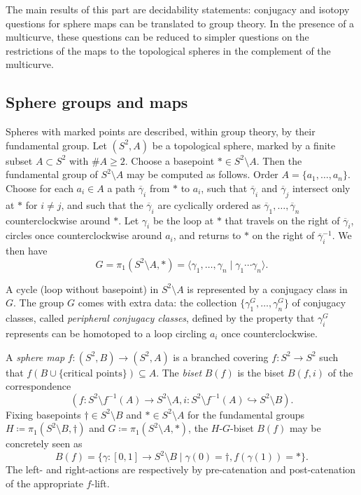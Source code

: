 \documentclass{amsart}
\begin{document}
The main results of this part are decidability statements: conjugacy
and isotopy questions for sphere maps can be translated to group
theory. In the presence of a multicurve, these questions can be
reduced to simpler questions on the restrictions of the maps to the
topological spheres in the complement of the multicurve.

\subsection{Sphere groups and maps}\label{ss:spheregroups}
Spheres with marked points are described, within group theory, by
their fundamental group. Let $(S^2,A)$ be a topological sphere, marked
by a finite subset $A\subset S^2$ with $\#A\ge 2$. Choose a basepoint
$*\in S^2\setminus A$. Then the fundamental group of $S^2\setminus A$
may be computed as follows. Order $A=\{a_1,\dots,a_n\}$. Choose for
each $a_i\in A$ a path $\overline\gamma_i$ from $*$ to $a_i$, such
that $\overline\gamma_i$ and $\overline\gamma_j$ intersect only at $*$
for $i\neq j$, and such that the $\overline\gamma_i$ are cyclically
ordered as $\overline\gamma_1,\dots,\overline\gamma_n$
counterclockwise around $*$. Let $\gamma_i$ be the loop at $*$ that
travels on the right of $\overline\gamma_i$, circles once
counterclockwise around $a_i$, and returns to $*$ on the right of
$\overline\gamma_i^{-1}$. We then have
\begin{equation}\label{eq:spheregroup}
  G=\pi_1(S^2\setminus A,*)=\langle \gamma_1,\dots,\gamma_n\mid \gamma_1\cdots\gamma_n\rangle.
\end{equation}

A cycle (loop without basepoint) in $S^2\setminus A$ is represented by
a conjugacy class in $G$. The group $G$ comes with extra data: the
collection $\{\gamma_1^G,\dots,\gamma_n^G\}$ of conjugacy classes,
called \emph{peripheral conjugacy classes}, defined by the property
that $\gamma_i^G$ represents can be homotoped to a loop
circling $a_i$ once counterclockwise.

A \emph{sphere map} $f\colon(S^2,B)\to(S^2,A)$ is a branched covering
$f\colon S^2\to S^2$ such that
$f(B\cup\{\text{critical points}\})\subseteq A$. The \emph{biset}
$B(f)$ is the biset $B(f,i)$ of the correspondence
\[(f\colon S^2\setminus f^{-1}(A)\to S^2\setminus A, i\colon S^2\setminus
  f^{-1}(A)\hookrightarrow S^2\setminus B).
\]
Fixing basepoints $\dagger\in S^2\setminus B$ and
$*\in S^2\setminus A$ for the fundamental groups
$H\coloneqq\pi_1(S^2\setminus B,\dagger)$ and
$G\coloneqq\pi_1(S^2\setminus A,*)$, the $H$-$G$-biset $B(f)$ may be
concretely seen as
\[B(f)=\{\gamma\colon[0,1]\to S^2\setminus B\mid \gamma(0)=\dagger,
  f(\gamma(1))=*\}.
\]
The left- and right-actions are respectively by pre-catenation and
post-catenation of the appropriate $f$-lift.
\end{document}
